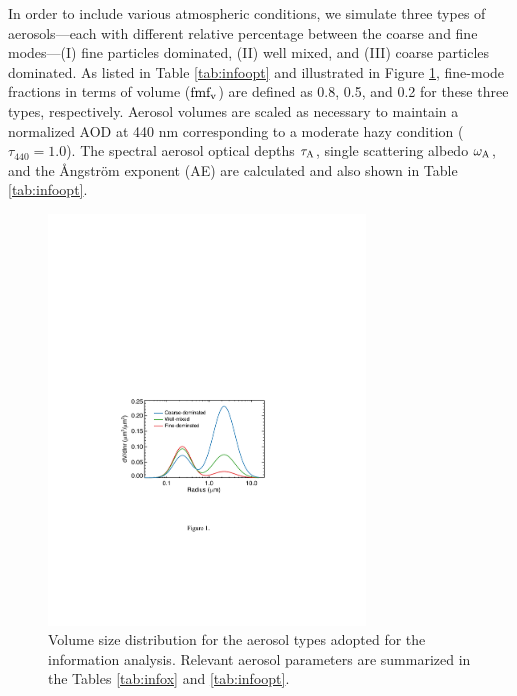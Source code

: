 In order to include various atmospheric conditions, we simulate three types of
aerosols---each with different relative percentage between the coarse and fine
modes---(I) fine particles dominated, (II) well mixed, and (III) coarse
particles dominated. As listed in Table \ref{tab:infoopt} and illustrated 
in Figure \ref{fig:infopsd}, fine-mode
fractions in terms of volume ($\text{fmf}_\text{v}$) are defined as 0.8, 0.5, and 0.2 for these
three types, respectively. Aerosol volumes are scaled as necessary to maintain
a normalized AOD at 440 nm corresponding to a moderate hazy condition
($\tau_{440}=1.0$). The spectral aerosol optical depths $\tau_\text{A}$, 
single scattering albedo $\omega_\text{A}$, and the Ångström exponent (AE) 
are calculated and also shown in Table \ref{tab:infoopt}. 

\begin{figure}[t]
  \centering
  \includegraphics[width={0.75\textwidth}]{figures/info01.pdf}
  \caption[Volume size distribution for the aerosol types adopted for
the information analysis.]
{Volume size distribution for the aerosol types adopted for the
information analysis. Relevant aerosol parameters are summarized in the Tables
\ref{tab:infox} and \ref{tab:infoopt}.}
  \label{fig:infopsd}
\end{figure}

